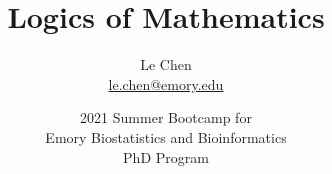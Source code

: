 


\title %
{
  Logics of Mathematics
}


\author{Le Chen\\
{\small\url{le.chen@emory.edu}}
}



\date[Atlanta]{\footnotesize 2021 Summer Bootcamp for \\ Emory Biostatistics and Bioinformatics\\ PhD Program
}



